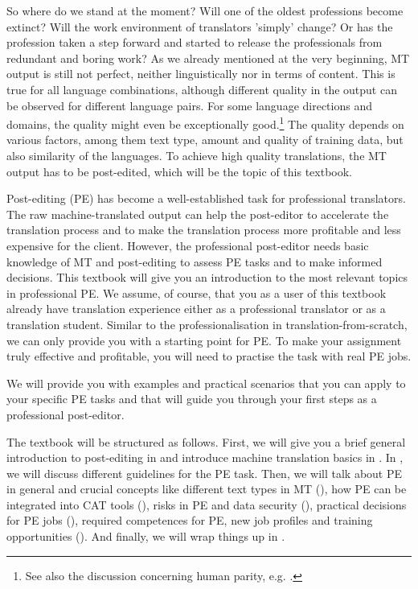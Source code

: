So where do we stand at the moment? Will one of the oldest professions become extinct? Will the work environment of translators 'simply' change? Or has the profession taken a step forward and started to release the professionals from redundant and boring work? As we already mentioned at the very beginning, MT output is still not perfect, neither linguistically nor in terms of content. This is true for all language combinations, although different quality in the output can be observed for different language pairs. For some language directions and domains, the quality might even be exceptionally good.\footnote{See also the discussion concerning human parity, e.g. \citet{laubli2020jair}.} The quality depends on various factors, among them text type, amount and quality of training data, but also similarity of the languages. To achieve high quality translations, the MT output has to be post-edited, which will be the topic of this textbook.

\bigskip

Post-editing (PE) has become a well-established task for professional translators. The raw machine-translated output can help the post-editor to accelerate the translation process and to make the translation process more profitable and less expensive for the client. However, the professional post-editor needs basic knowledge of MT and post-editing to assess PE tasks and to make informed decisions. This textbook will give you an introduction to the most relevant topics in professional PE. We assume, of course, that you as a user of this textbook already have translation experience either as a professional translator or as a translation student. Similar to the professionalisation in translation-from-scratch, we can only provide you with a starting point for PE. To make your assignment truly effective and profitable, you will need to practise the task with real PE jobs.
 
We will provide you with examples and practical scenarios that you can apply to your specific PE tasks and that will guide you through your first steps as a professional post-editor.
 
The textbook will be structured as follows. First, we will give you a brief general introduction to post-editing in  and introduce machine translation basics in . In , we will discuss different guidelines for the PE task. Then, we will talk about PE in general and crucial concepts like different text types in MT (), how PE can be integrated into CAT tools (), risks in PE and data security (), practical decisions for PE jobs (), required competences for PE, new job profiles and training opportunities (). And finally, we will wrap things up in .

